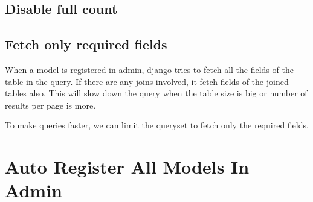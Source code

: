 \documentclass[letterpaper,12pt,english]{sphinxmanual}
\begin{document}
\section{Disable full count}
\label{\detokenize{admin_better_defaults:disable-full-count}}
\begin{sphinxVerbatim}[commandchars=\\\{\}]
  
\end{sphinxVerbatim}


\section{Fetch only required fields}
\label{\detokenize{admin_better_defaults:fetch-only-required-fields}}
When a model is registered in admin, django tries to fetch all the fields of the table in the query. If there are any joins involved, it fetch fields of the joined tables also. This will slow down the query when the table size is big or number of results per page is more.

To make queries faster, we can limit the queryset to fetch only the required fields.

\begin{sphinxVerbatim}[commandchars=\\\{\}]
 
      
          
           
         


 
\end{sphinxVerbatim}


\chapter{Auto Register All Models In Admin}
\label{\detokenize{admin_auto_register_models:auto-register-all-models-in-admin}}\label{\detokenize{admin_auto_register_models::doc}}
\end{document}
